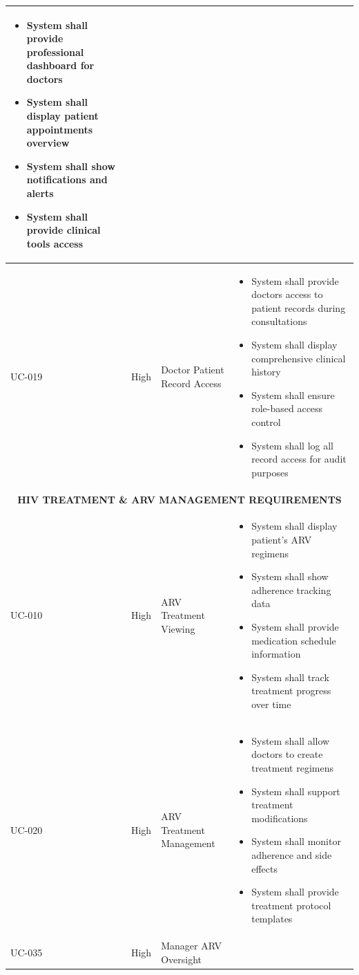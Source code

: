 \documentclass[12pt,a4paper]{article}
\begin{document}
\begin{longtable}{|p{1.2cm}|p{2.5cm}|p{3.5cm}|p{6.8cm}|}
\begin{itemize}[leftmargin=*,topsep=1pt,partopsep=0pt,parsep=0pt,itemsep=1pt]
\item System shall provide professional dashboard for doctors
\item System shall display patient appointments overview
\item System shall show notifications and alerts
\item System shall provide clinical tools access
\end{itemize} \\
\hline
UC-019 & High & Doctor Patient Record Access & 
\begin{itemize}[leftmargin=*,topsep=1pt,partopsep=0pt,parsep=0pt,itemsep=1pt]
\item System shall provide doctors access to patient records during consultations
\item System shall display comprehensive clinical history
\item System shall ensure role-based access control
\item System shall log all record access for audit purposes
\end{itemize} \\
\hline
\multicolumn{4}{|c|}{\textbf{HIV TREATMENT \& ARV MANAGEMENT REQUIREMENTS}} \\
\hline
UC-010 & High & ARV Treatment Viewing & 
\begin{itemize}[leftmargin=*,topsep=1pt,partopsep=0pt,parsep=0pt,itemsep=1pt]
\item System shall display patient's ARV regimens
\item System shall show adherence tracking data
\item System shall provide medication schedule information
\item System shall track treatment progress over time
\end{itemize} \\
\hline
UC-020 & High & ARV Treatment Management & 
\begin{itemize}[leftmargin=*,topsep=1pt,partopsep=0pt,parsep=0pt,itemsep=1pt]
\item System shall allow doctors to create treatment regimens
\item System shall support treatment modifications
\item System shall monitor adherence and side effects
\item System shall provide treatment protocol templates
\end{itemize} \\
\hline
UC-035 & High & Manager ARV Oversight & 

\end{longtable}
\end{document}
